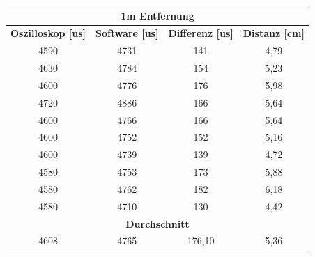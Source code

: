 \begin{table}[H]
\begin{tabular}{|c|c|c|c|}
\hline
\multicolumn{4}{|c|}{\textbf{1m Entfernung}}                                                                         \\ \hline
\textbf{Oszilloskop {[}us{]}} & \textbf{Software {[}us{]}} & \textbf{Differenz {[}us{]}} & \textbf{Distanz {[}cm{]}} \\ \hline
4590                          & 4731                       & 141                         & 4,79                      \\ \hline
4630                          & 4784                       & 154                         & 5,23                      \\ \hline
4600                          & 4776                       & 176                         & 5,98                      \\ \hline
4720                          & 4886                       & 166                         & 5,64                      \\ \hline
4600                          & 4766                       & 166                         & 5,64                      \\ \hline
4600                          & 4752                       & 152                         & 5,16                      \\ \hline
4600                          & 4739                       & 139                         & 4,72                      \\ \hline
4580                          & 4753                       & 173                         & 5,88                      \\ \hline
4580                          & 4762                       & 182                         & 6,18                      \\ \hline
4580                          & 4710                       & 130                         & 4,42                      \\ \hline
\multicolumn{4}{|c|}{\textbf{Durchschnitt}}                                                                          \\ \hline
4608                          & 4765                       & 176,10                      & 5,36                      \\ \hline
\end{tabular}
\end{table}

